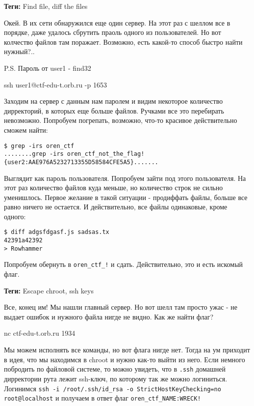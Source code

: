 \documentclass[idxtotoc,hyperref,openany,oneside]{files/admin} %
\begin{document}



\textbf{Теги:} Find file, diff the files\vspace{\baselineskip}

\begin{tcolorbox}
Окей. В их сети обнаружился еще один сервер. На этот раз с шеллом все в порядке, даже удалось сбрутить праоль одного из пользователей. Но вот колчество файлов там поражает. Возможно, есть какой-то способ быстро найти нужный?.. 

P.S. Пароль от user1 - find32

ssh user1@ctf-edu-t.orb.ru -p 1653
\end{tcolorbox}

Заходим на сервер с данным нам паролем и видим некоторое количество дирректорий, в которых еще больше файлов. Ручками все это перебирать невозможно. Попробуем погрепать, возможно, что-то красивое действительно сможем найти:
\begin{verbatim}
$ grep -irs oren_ctf
........grep -irs oren_ctf_not_the_flag!{user2:AAE976A5232713355D58584CFE5A5}.......
\end{verbatim}

Выглядит как пароль пользователя. Попробуем зайти под этого пользователя. На этот раз количество файлов куда меньше, но количество строк не сильно уменишлось. Первое желание в такой ситуации - продиффать файлы, больше все равно ничего не остается. И действительно, все файлы одинаковые, кроме одного:
\begin{verbatim}
$ diff adgsfdgasf.js sadsas.tx 
42391a42392
> Rowhammer
\end{verbatim}

Попробуем обернуть в \verb|oren_ctf_!| и сдать. Действительно, это и есть искомый флаг.




\textbf{Теги:} Escape chroot, ssh keys\vspace{\baselineskip}

\begin{tcolorbox}
Все, конец им! Мы нашли главный сервер. Но вот шелл там просто ужас - не выдает ошибок и нужного файла нигде не видно. Как же найти флаг?

nc ctf-edu-t.orb.ru 1934
\end{tcolorbox}

Мы можем исполнять все команды, но вот флага нигде нет. Тогда на ум приходит в идея, что мы находимся в chroot и нужно как-то выйти из него. Если немного побродить по файловой системе, то можно увидеть, что в \verb|.ssh| домашней дирректории рута лежит ssh-ключ, по которому так же можно логиниться. Логинимся \verb|ssh -i /root/.ssh/id_rsa -o StrictHostKeyChecking=no root@localhost| и получаем в ответ флаг \verb|oren_ctf_NAME:WRECK!|

\end{document}
